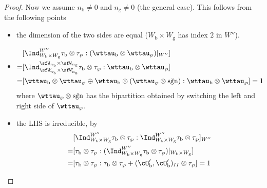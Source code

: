 \documentclass[12pt,a4paper]{amsart}
\newcommand{\sgn}{\operatorname{sgn}}
\numberwithin{equation}{section}
\theoremstyle{remark}
\def\brsgn{\breve{\sgn}}
\def\nbb{n_{\mathrm b}}
\def\ngg{n_{\mathrm g}}
\def\cOpb{\cO'_{\mathrm b}}
\begin{document}
{\begin{proof}
{    Now we assume $\nbb\neq 0$ and $\ngg\neq 0$ (the general case). This
    follows from the following points
    \begin{itemize}
      \item the dimension of the two sides are equal ($W_{\mathrm b}\times W_{\mathrm g}$ has
            index $2$ in $W''$).
      \item
            \[
            \begin{split}
              &[\Ind_{W_{\mathrm b}\times W_{\mathrm g}}^{W''}\tau_{\mathrm b}\otimes \tau_{\wp}:(\wttau_{\mathrm b}\otimes \wttau_{\wp})|_{W''}] \\
              =& [\Ind_{\sfW'_{n_{\mathrm b}}\times \sfW'_{n_{\mathrm g}}}^{\sfW_{n_{\mathrm b}}\times \sfW_{n_{\mathrm g}}}\tau_{\mathrm b}\otimes \tau_{\wp}:\wttau_{\mathrm b}\otimes \wttau_{\wp}]\\
              =& [\wttau_{\mathrm b}\otimes \wttau_{\wp} \oplus \wttau_{\mathrm b}\otimes (\wttau_{\wp}\otimes \brsgn):\wttau_{\mathrm b}\otimes \wttau_{\wp}] =1\\
            \end{split}
            \]
            where $\wttau_{\wp}\otimes \brsgn$ has the bipartition obtained by
            switching the left and right side of $\wttau_{\wp}$.
      \item the LHS is irreducible, by
            \[
            \begin{split}
              & [\Ind_{W_{\mathrm b}\times W_{\mathrm g}}^{W''}\tau_{\mathrm b}\otimes \tau_{\wp}:
              \Ind_{W_{\mathrm b}\times W_{\mathrm g}}^{W''}\tau_{\mathrm b}\otimes \tau_{\wp}]_{W''}\\
              =&  [\tau_{\mathrm b}\otimes \tau_{\wp} : (\Ind_{W_{\mathrm b}\times W_{\mathrm g}}^{W''}\tau_{\mathrm b}\otimes \tau_{\wp})|_{W_{\mathrm b}\times W_{\mathrm g}}]\\
              =& [\tau_{\mathrm b}\otimes \tau_{\wp} : \tau_{\mathrm b}\otimes \tau_{\wp} + (\cOpb,\cOpb)_{II} \otimes \tau_{\wp} ] = 1
            \end{split}
            \]
    \end{itemize}
  }


\end{proof}}
\end{document}
